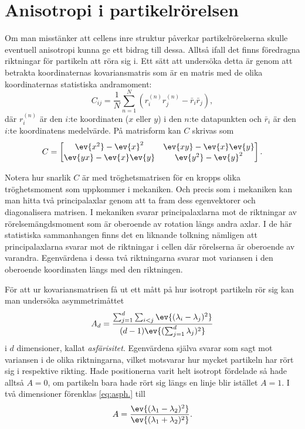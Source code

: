 \section{Anisotropi i partikelrörelsen}
Om man misstänker att cellens inre struktur påverkar partikelrörelserna skulle eventuell anisotropi kunna ge ett bidrag till dessa. Alltså ifall det finns föredragna riktningar för partikeln att röra sig i. Ett sätt att undersöka detta är genom att betrakta koordinaternas kovariansmatris som är en matris med de olika koordinaternas statistiska andramoment:
\begin{equation}
C_{ij} = \frac{1}{N} \sum_{n=1}^{N} 
\left(r_i^{(n)}r_j^{(n)} -\bar{r}_i\bar{r}_j \right),
\end{equation}
där $r_i^{(n)}$ är den $i$:te koordinaten ($x$ eller $y$) i den $n$:te datapunkten och $\bar{r}_i$ är den $i$:te koordinatens medelvärde. På matrisform kan $C$ skrivas som
\begin{equation}\label{eq:C_matris}
C=
\begin{bmatrix} 
\ev{x^2}-\ev{x}^2 & \ev{xy}-\ev{x}\ev{y}\\
\ev{yx}-\ev{x}\ev{y} & \ev{y^2}-\ev{y}^2
\end{bmatrix}.
\end{equation}

Notera hur snarlik $C$ är med tröghetsmatrisen för en kropps olika tröghetsmoment som uppkommer i mekaniken. Och precis som i mekaniken kan man hitta två principalaxlar genom att ta fram dess egenvektorer och diagonalisera matrisen. I mekaniken svarar principalaxlarna mot de riktningar av rörelsemängdsmoment som är oberoende av rotation längs andra axlar. I de här statistiska sammanhangen finns det en liknande tolkning nämligen att principalaxlarna svarar mot de riktningar i cellen där rörelserna är oberoende av varandra. Egenvärdena i dessa två riktningarna svarar mot variansen i den oberoende koordinaten längs med den riktningen.

För att ur kovariansmatrisen få ut ett mått på hur isotropt partikeln rör sig kan man undersöka asymmetrimåttet~\cite{Rudnick_Asphericity1986}
\begin{equation}\label{eq:asph.}
    A_d=\frac{\sum_{j=1}^d\sum_{i<j} 
\ev{(\lambda_i-\lambda_j)^2} }{
(d-1) \ev{(\sum_{j=1}^d \lambda_j)^2}}
\end{equation}
i $d$ dimensioner, kallat \emph{asfärisitet}. Egenvärdena själva svarar som sagt mot variansen i de olika riktningarna, vilket motsvarar hur mycket partikeln har rört sig i respektive rikting. Hade positionerna varit helt isotropt fördelade så hade alltså $A=0$, om partikeln bara hade rört sig längs en linje blir istället $A=1$.
I två dimensioner förenklas \eqref{eq:asph.} till 
\begin{equation}\label{eq:asph._2D}
    A=\frac{\ev{(\lambda_1 - \lambda_2)^2}}{\ev{(\lambda_1 + \lambda_2)^2}}.
\end{equation}

